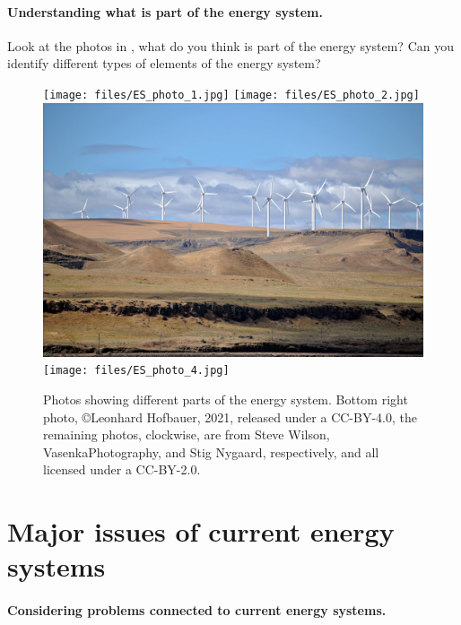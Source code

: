 
\paragraph*{Understanding what is part of the energy system.}

\begin{kaobox}[frametitle=Task]
Look at the photos in , what do you think is part of the energy system? Can you identify different types of elements of the energy system?
\end{kaobox}

\begin{figure}[hb]
	\texttt{[image: files/ES\_photo\_1.jpg]}
	\texttt{[image: files/ES\_photo\_2.jpg]}\\
	\includegraphics[height=0.34\textwidth]{files/ES_photo_3.jpg}
	\texttt{[image: files/ES\_photo\_4.jpg]}
	\caption[Photos showing different parts of the energy system.]{Photos showing different parts of the energy system. Bottom right photo, \copyright Leonhard Hofbauer, 2021, released under a CC-BY-4.0, the remaining photos, clockwise, are from Steve Wilson, VasenkaPhotography, and Stig Nygaard, respectively, and all licensed under a CC-BY-2.0.}
\end{figure}


 
\section{Major issues of current energy systems}

\paragraph*{Considering problems connected to current energy systems.}

